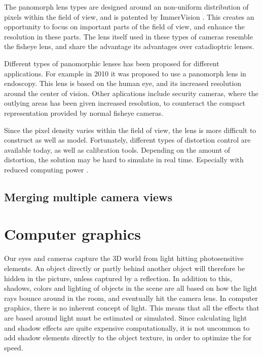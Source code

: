 The panomorph lens types are designed around an non-uniform distribution of pixels within the field of view, and is patented by ImmerVision . This creates an opportunity to focus on important parts of the field of view, and enhance the resolution in these parts. The lens itself used in these types of cameras resemble the fisheye lens, and share the advantage its advantages over catadioptric lenses. 

Different types of panomorphic lenses has been proposed for different applications. For example in 2010 it was proposed to use a panomorph lens in endoscopy\cite{endoscopypano}. This lens is based on the human eye, and its increased resolution around the center of vision. Other aplications include security cameras, where the outlying areas has been given increased resolution, to counteract the compact representation provided by normal fisheye cameras.

Since the pixel density varies within the field of view, the lens is more difficult to construct as well as model. Fortunately, different types of distortion control are available today, as well as calibration tools. Depending on the amount of distortion, the solution may be hard to simulate in real time. Especially with reduced computing power .

\subsection{Merging multiple camera views}

\section{Computer graphics}

Our eyes and cameras capture the 3D world from light hitting photosensitive elements. An object directly or partly behind another object will therefore be hidden in the picture, unless captured by a reflection. In addition to this, shadows, colors and lighting of objects in the scene are all based on how the light rays bounce around in the room, and eventually hit the camera lens. In computer graphics, there is no inherent concept of light. This means that all the effects that are based around light must be estimated or simulated. Since calculating light and shadow effects are quite expensive computationally, it is not uncommon to add shadow elements directly to the object texture, in order to optimize the for speed.

